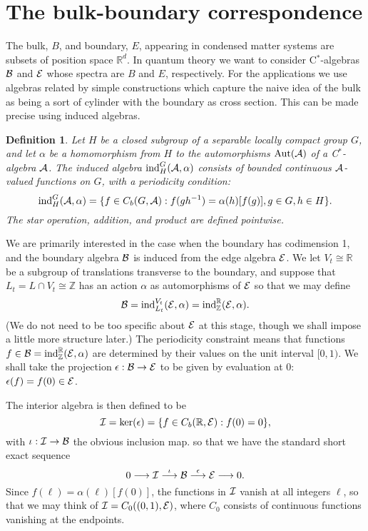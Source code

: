 \documentclass[11pt]{article}
\newcommand{\real}{{\mathbb R}}
\newcommand{\integer}{{\mathbb Z}}
\newcommand{\alg}{{\cal A}}
\newcommand{\cb}{{\cal B}}
\newcommand{\ce}{{\cal E}}
\newcommand{\ci}{{\cal I}}
\newcommand{\ind}{{\rm ind}}
\newcommand{\aut}{{\rm Aut}}
\newcommand\rmap[1]{\stackrel{#1}\longrightarrow}
\newtheorem{definition}[theorem]{Definition}
\begin{document}
\section{The bulk-boundary correspondence}

The bulk, $B$, and boundary, $E$, appearing in condensed matter systems are subsets of  position space  $\real^d$. In quantum theory we want to consider C$^*$-algebras $\cb$ and $\ce$ whose spectra are $B$ and $E$, respectively.
For the applications we use algebras related by simple constructions which capture the naive idea of the bulk as being a sort of cylinder with the boundary as cross section.
This can be made precise using induced algebras. 

\begin{definition}
Let $H$ be a closed subgroup of a separable locally compact group $G$, and let $\alpha$ be a 
homomorphism from  $H$ to the automorphisms $\aut(\alg)$ of a C$^*$-algebra $\alg$.
The induced algebra $\ind_H^G(\alg,\alpha)$
consists of bounded continuous $\alg$-valued functions on $G$, with a periodicity condition:
$$
\ind_H^G(\alg,\alpha) = \{ f\in C_b(G,\alg): f(gh^{-1}) = \alpha(h)[f(g)], g\in G, h\in H\}.
$$
The star operation, addition, and product are defined pointwise.
\end{definition}

We are primarily interested in the case when the boundary has codimension 1, and the boundary algebra $\cb$ is induced from the edge algebra $\ce$. We let $V_t \cong \real$ be a subgroup of translations transverse to the boundary, and suppose that $L_t = L\cap V_t \cong \integer$ has  an action $\alpha$ as automorphisms of $\ce$ so that we may define
$$
\cb = \ind_{L_t}^{V_t}(\ce,\alpha)= \ind_\integer^\real(\ce,\alpha).
$$
(We do not need to be too specific about $\ce$ at this stage, though we shall impose a little more structure later.)
The periodicity constraint means that functions $f \in \cb  = \ind_\integer^\real(\ce,\alpha)$ are determined by their values on the unit interval $[0,1)$. We shall take the projection $\epsilon:\cb \to \ce$ to be given by evaluation at 0: $\epsilon(f) = f(0) \in \ce$.

The interior algebra is then defined to be
$$
\ci = \ker(\epsilon) = \{ f\in C_b(\real,\ce): f(0) = 0\},
$$
with $\iota:\ci \to \cb$ the obvious inclusion map. 
so that we have the standard short exact sequence
$$
0 \longrightarrow \ci \rmap{\iota} \cb \rmap{\epsilon} \ce \longrightarrow 0.
$$
Since $f(\ell)  = \alpha(\ell)[f(0)]$, the functions in $\ci$ vanish at all integers $\ell$, so that we may think of $\ci = C_0((0,1),\ce)$, where $C_0$ consists of continuous functions vanishing at the endpoints. 
\end{document}
